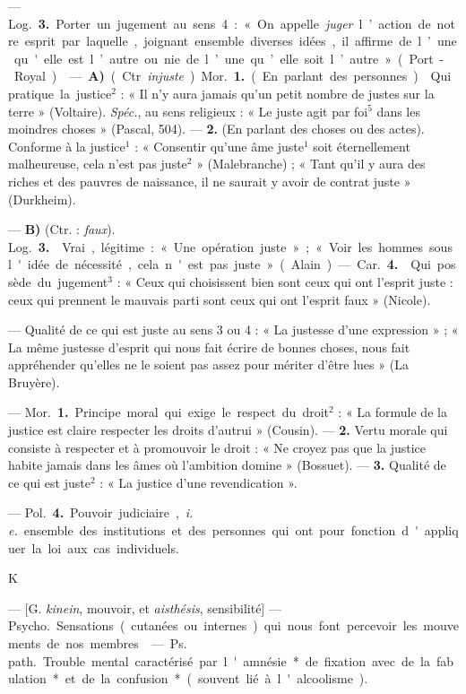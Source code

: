 \begin{itemize}[leftmargin=1cm, label=, itemsep=1pt]
— \si{Log.} {\bf 3.} Porter un jugement au sens 4 : « On appelle {\it juger}
l’action de notre esprit par laquelle, joignant ensemble diverses idées, il
affirme de l’une qu'elle est l’autre ou nie de l’une qu’elle soit
l’autre » (Port-Royal).

 — {\bf A)} (Ctr. {\it injuste}). \si{Mor.} {\bf 1.} (En parlant des
personnes).  Qui pratique la justice$^2$ : « Il n’y aura jamais
qu’un petit nombre de justes sur la terre » (Voltaire). {\it Spéc.}, au sens
religieux : « Le juste agit par foi$^5$ dans les moindres choses » (Pascal,
504). — {\bf 2.} (En parlant des choses ou des actes). 
Conforme à la justice$^1$ : « Consentir qu’une âme juste$^1$ soit
éternellement malheureuse, cela n’est pas juste$^2$ » (Malebranche) ;
« Tant qu'il y aura des riches et des pauvres de naissance, il ne saurait y
avoir de contrat juste » (Durkheim).

— {\bf B)} (Ctr. : {\it faux}). \si{Log.} {\bf 3.}  Vrai, légitime :
« Une opération juste » ; « Voir les hommes sous l'idée de nécessité, cela
n'est pas juste » (Alain). — \si{Car.} {\bf 4.}  Qui possède du
jugement$^3$ : « Ceux qui choisissent bien sont ceux qui ont l'esprit juste :
ceux qui prennent le mauvais parti sont ceux qui ont l'esprit faux » (Nicole).

 — Qualité de ce qui est juste au sens 3 ou 4 : « La justesse
d’une expression » ; « La même justesse d'esprit qui nous fait écrire de
bonnes choses, nous fait appréhender qu'elles ne le soient pas assez pour
mériter d’être lues » (La Bruyère).

 — \si{Mor.} {\bf 1.} Principe moral qui exige le respect du
droit$^2$ : « La formule de la justice est claire respecter les droits
d’autrui » (Cousin). — {\bf 2.} Vertu morale qui consiste à respecter et à
promouvoir le droit : « Ne croyez pas que la justice habite jamais dans les
âmes où l'ambition domine » (Bossuet). — {\bf 3.}  Qualité de
ce qui est juste$^2$ : « La justice d’une revendication ».

— \si{Pol.} {\bf 4.} Pouvoir judiciaire, {\it i. e.} ensemble des institutions
et des personnes qui ont pour fonction d'appliquer la loi aux cas individuels.

\begin{center}
\huge{K}
\end{center}

 — [G. {\it kinein}, mouvoir, et
{\it aisthésis}, sensibilité] — \si{Psycho.} Sensations (cutanées ou internes)
qui nous font percevoir les mouvements de nos membres.

 — \si{Ps. path.} Trouble mental caractérisé par
l'amnésie* de fixation avec de la fabulation* et de la confusion* (souvent lié
à l'alcoolisme).

	\end{itemize}
